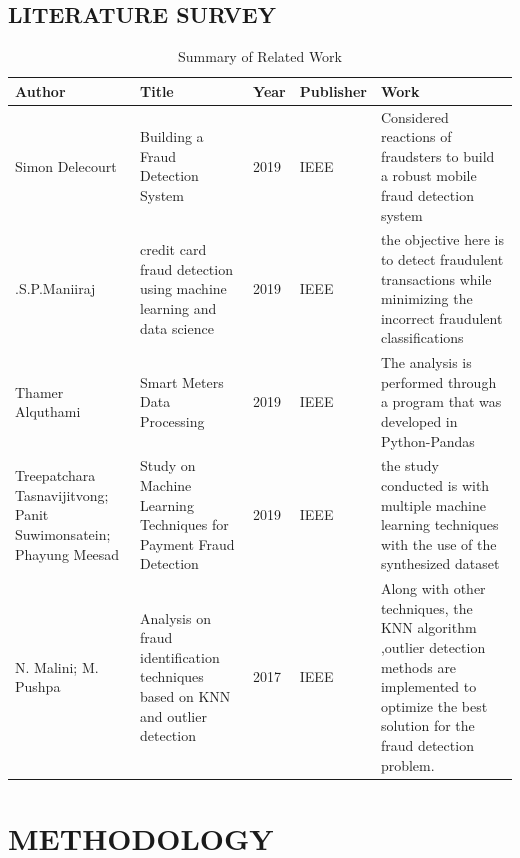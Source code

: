 \documentclass[12pt]{article}
\begin{document}
\subsection{LITERATURE SURVEY}
\begin{table}[htbp]
\begin{center}
\begin{tabular}{|p{2.2cm}|p{2.5cm}|p{1cm}|p{1cm}|p{6cm}|}
 \hline
 Author&Title&Year&Publisher&Work\\ 
  \hline
  Simon Delecourt&Building a  Fraud Detection System&2019&IEEE& Considered  reactions of fraudsters to build a robust mobile fraud detection system
 \\ 
  \hline
 .S.P.Maniiraj& credit card fraud detection using machine learning and data science&2019&IEEE&the objective here is to detect fraudulent transactions while minimizing the incorrect fraudulent classifications \\ 
 \hline
Thamer Alquthami&Smart Meters Data Processing&2019&IEEE&The analysis is performed through a program that was developed in Python-Pandas \\ 
 \hline
  Treepatchara Tasnavijitvong; Panit Suwimonsatein; Phayung Meesad&Study on Machine Learning Techniques for Payment Fraud Detection&2019&IEEE&the study conducted is with multiple machine learning techniques with the use of the synthesized dataset \\ 
 \hline
 N. Malini; M. Pushpa&Analysis on fraud identification techniques based on KNN and outlier detection&2017&IEEE&Along with other techniques, the KNN algorithm ,outlier detection methods are implemented to optimize the best solution for the fraud detection problem. \\ 
 \hline
\end{tabular}
\end{center}
\caption{Summary of Related Work}
\end{table}
\pagebreak
\section{METHODOLOGY}
\end{document}
